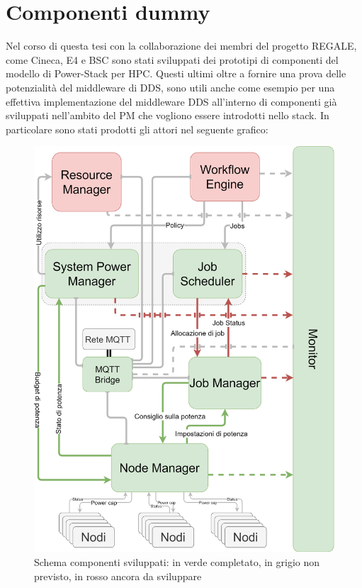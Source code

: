 \chapter{Componenti dummy}
Nel corso di questa tesi con la collaborazione dei membri del progetto REGALE, come Cineca\cite{Cineca}, E4\cite{E4} e BSC\cite{BSC} sono stati sviluppati dei prototipi di componenti del modello di Power-Stack per HPC.
Questi ultimi oltre a fornire una prova delle potenzialità del middleware di DDS, sono utili anche come esempio per una effettiva implementazione del middleware DDS all'interno di componenti già sviluppati nell'ambito del PM che vogliono essere introdotti nello stack.
In particolare sono stati prodotti gli attori nel seguente grafico:
\begin{figure}[H]
    \centering
    \includegraphics[width=\textwidth]{./img/SchemaPowerStack_perdummy.drawio.png}
    \caption{Schema componenti sviluppati: in verde completato, in grigio non previsto, in rosso ancora da sviluppare}
\end{figure}

